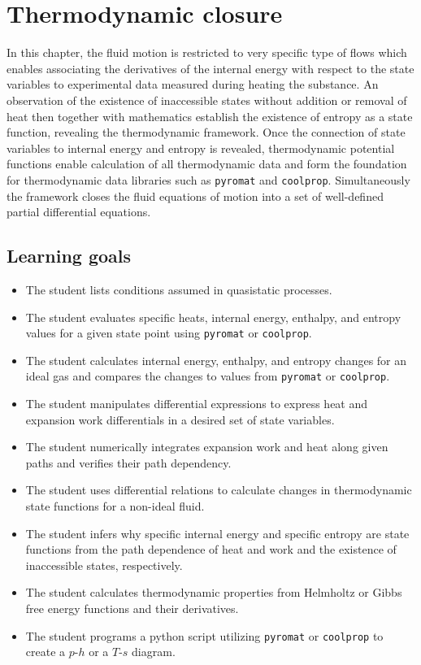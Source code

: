 \chapter{Thermodynamic closure}
In this chapter, the fluid motion is restricted to very specific type of flows which enables associating the derivatives of the internal energy with respect to the state variables to experimental data measured during heating the substance. An observation of the existence of inaccessible states without addition or removal of heat then together with mathematics establish the existence of entropy as a state function, revealing the thermodynamic framework. Once the connection of state variables to internal energy and entropy is revealed, thermodynamic potential functions enable calculation of all thermodynamic data and form the foundation for thermodynamic data libraries such as \verb|pyromat| and \verb|coolprop|. Simultaneously the framework closes the fluid equations of motion into a set of well-defined partial differential equations.

\section{Learning goals}
\begin{itemize}
    \item[\elementary] The student lists conditions assumed in quasistatic processes.
    \item[\elementary] The student evaluates specific heats, internal energy, enthalpy, and entropy values for a given state point using \verb|pyromat| or \verb|coolprop|.
    \item[\elementary] The student calculates internal energy, enthalpy, and entropy changes for an ideal gas and compares the changes to values from \verb|pyromat| or \verb|coolprop|.
    \item[\intermediate] The student manipulates differential expressions to express heat and expansion work differentials in a desired set of state variables.
    \item[\intermediate] The student numerically integrates expansion work and heat along given paths and verifies their path dependency.
    \item[\intermediate] The student uses differential relations to calculate changes in thermodynamic state functions for a non-ideal fluid.
    \item[\advanced] The student infers why specific internal energy and specific entropy are state functions from the path dependence of heat and work and the existence of inaccessible states, respectively.
    \item[\advanced] The student calculates thermodynamic properties from Helmholtz or Gibbs free energy functions and their derivatives.
    \item[\advanced] The student programs a python script utilizing \verb|pyromat| or \verb|coolprop| to create a $p$-$h$ or a $T$-$s$ diagram.
\end{itemize}

